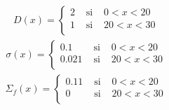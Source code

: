 \documentclass[11pt,a4paper]{emulateapj}
\begin{document}
\begin{eqnarray}
	D(x)=\left\{
		\begin{matrix}
			2 &\mbox{ si }& 0 < x < 20\\
			1 & \mbox{ si }& 20 < x < 30\\
		\end{matrix} \right.
\end{eqnarray}
\begin{eqnarray}
	\sigma(x)=\left\{
		\begin{matrix}
			0.1 &\mbox{ si }& 0 < x < 20\\
			0.021 & \mbox{ si }& 20 < x < 30\\
		\end{matrix} \right.
\end{eqnarray}
\begin{eqnarray}
	\Sigma_f(x)=\left\{
		\begin{matrix}
			0.11 &\mbox{ si }& 0 < x < 20\\
			0 & \mbox{ si }& 20 < x < 30\\
		\end{matrix} \right.
\end{eqnarray}
\end{document}
